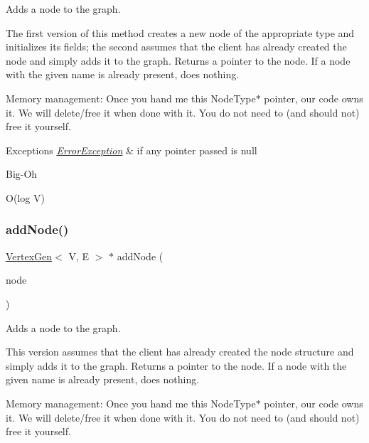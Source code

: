 Adds a node to the graph. 

The first version of this method creates a new node of the appropriate type and initializes its fields; the second assumes that the client has already created the node and simply adds it to the graph. Returns a pointer to the node. If a node with the given name is already present, does nothing.

Memory management\+: Once you hand me this Node\+Type$\ast$ pointer, our code owns it. We will delete/free it when done with it. You do not need to (and should not) free it yourself.


\begin{DoxyExceptions}{Exceptions}
{\em \mbox{\hyperlink{classErrorException}{Error\+Exception}}} & if any pointer passed is null \\
\hline
\end{DoxyExceptions}
\begin{DoxyRefDesc}{Big-\/\+Oh}
\item[\mbox{\hyperlink{BigOh__BigOh000045}{Big-\/\+Oh}}]O(log V) \end{DoxyRefDesc}
\mbox{\label{classGraph_a635fa78d72315816cef6c091acfa3882}} 
\subsubsection{\texorpdfstring{add\+Node()}{addNode()}\hspace{0.1cm}{\footnotesize\ttfamily [2/2]}}
{\footnotesize\ttfamily \mbox{\hyperlink{classVertexGen}{Vertex\+Gen}}$<$ V, E $>$  $\ast$ add\+Node (\begin{DoxyParamCaption}\item[{\mbox{\hyperlink{classVertexGen}{Vertex\+Gen}}$<$ V, E $>$  $\ast$}]{node }\end{DoxyParamCaption})\hspace{0.3cm}{\ttfamily [inherited]}}



Adds a node to the graph. 

This version assumes that the client has already created the node structure and simply adds it to the graph. Returns a pointer to the node. If a node with the given name is already present, does nothing.

Memory management\+: Once you hand me this Node\+Type$\ast$ pointer, our code owns it. We will delete/free it when done with it. You do not need to (and should not) free it yourself.


